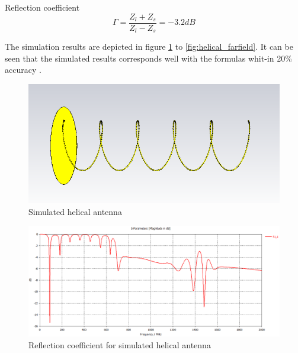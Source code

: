 Reflection coefficient 
\begin{equation}
\Gamma = \frac{Z_l+Z_s}{Z_l-Z_s} = -3.2dB
\end{equation}  
\label{eq:heli4}

The simulation results are depicted in figure \ref{fig:helical_cst} to \ref{fig:helical_farfield}. It can be seen that the simulated results corresponds well with the formulas whit-in 20\% accuracy . 

\begin{figure}[H]
\centering 
\includegraphics[scale = 0.5]{figures/antennas/helical/helical_cst}
\caption{Simulated helical antenna}
\label{fig:helical_cst}
\end{figure}

\begin{figure}[H]
\centering 
\includegraphics[scale = 0.5]{figures/antennas/helical/helical_cst_s11}
\caption{Reflection coefficient for simulated helical antenna}
\label{fig:helical_s11}
\end{figure}

